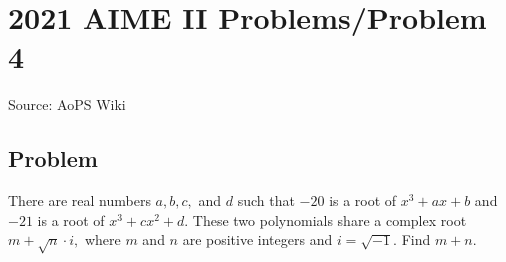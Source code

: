 \documentclass[12pt]{article}
\begin{document}
\section*{{2021 AIME II Problems/Problem 4}}
Source: AoPS Wiki

\subsection*{Problem}
There are real numbers $a, b, c,$ and $d$ such that $-20$ is a root of $x^3 + ax + b$ and $-21$ is a root of $x^3 + cx^2 + d.$ These two polynomials share a complex root $m + \sqrt{n} \cdot i,$ where $m$ and $n$ are positive integers and $i = \sqrt{-1}.$ Find $m+n.$
\end{document}
